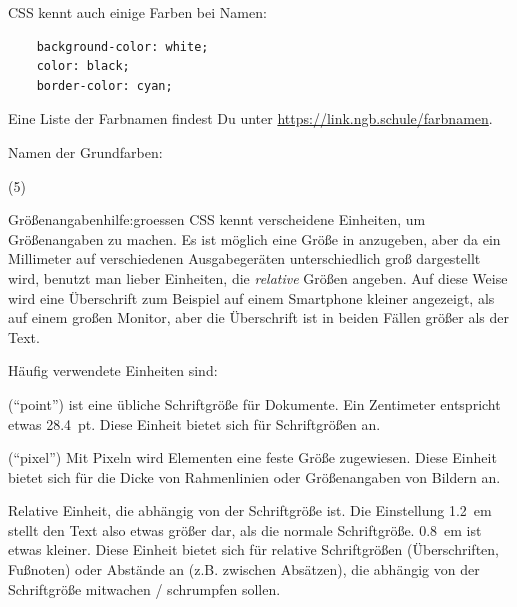 \documentclass[lerntheke,12pt,a5paper,landscape]{arbeitsblatt}
\begin{document}
\begin{loesungskarte}
	CSS kennt auch einige Farben bei Namen:
	\begin{verbatim}
	background-color: white;
	color: black;
	border-color: cyan;
	\end{verbatim}

	Eine Liste der Farbnamen findest Du unter \url{https://link.ngb.schule/farbnamen}.

	Namen der Grundfarben:
	\begin{tasks}[label=](5)
		\task {}
		\task {}
		\task {}
		\task {}
		\task {}
		\task {}
		\task {}
		\task {}
		\task {}
		\task {}
		\task {}
		\task {}
		\task {}
		\task {}
		\task {}
		\task {}
	\end{tasks}
\end{loesungskarte}

\begin{hilfekarte}{Größenangaben}{hilfe:groessen}
CSS kennt verscheidene Einheiten, um Größenangaben zu machen. Es ist möglich eine Größe in  anzugeben, aber da ein Millimeter auf verschiedenen Ausgabegeräten unterschiedlich groß dargestellt wird, benutzt man lieber Einheiten, die \emph{relative} Größen angeben. Auf diese Weise wird eine Überschrift zum Beispiel auf einem Smartphone kleiner angezeigt, als auf einem großen Monitor, aber die Überschrift ist in beiden Fällen größer als der Text.

Häufig verwendete Einheiten sind:
\begin{smalldescr}
	\item[\code{pt}] (\enquote{point}) \code{12pt} ist eine übliche Schriftgröße für Dokumente. Ein Zentimeter entspricht etwas \SI{28,4}{pt}. Diese Einheit bietet sich für Schriftgrößen an.
	\item[\code{px}] (\enquote{pixel}) Mit Pixeln wird Elementen eine feste Größe zugewiesen. Diese Einheit bietet sich für die Dicke von Rahmenlinien oder Größenangaben von Bildern an.
	\item[\code{em}] Relative Einheit, die abhängig von der Schriftgröße ist. Die Einstellung \SI{1.2}{em} stellt den Text also etwas größer dar, als die normale Schriftgröße. \SI{0.8}{em} ist etwas kleiner. Diese Einheit bietet sich für relative Schriftgrößen (Überschriften, Fußnoten) oder Abstände an (z.B. zwischen Absätzen), die abhängig von der Schriftgröße mitwachen / schrumpfen sollen.
\end{smalldescr}
\end{hilfekarte}
\end{document}
